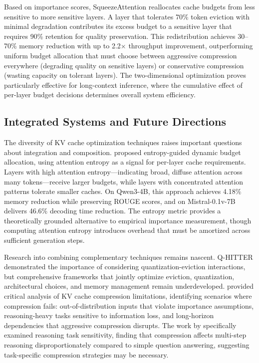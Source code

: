 Based on importance scores, SqueezeAttention reallocates cache budgets from less sensitive to more sensitive layers. A layer that tolerates 70\% token eviction with minimal degradation contributes its excess budget to a sensitive layer that requires 90\% retention for quality preservation. This redistribution achieves 30--70\% memory reduction with up to 2.2$\times$ throughput improvement, outperforming uniform budget allocation that must choose between aggressive compression everywhere (degrading quality on sensitive layers) or conservative compression (wasting capacity on tolerant layers). The two-dimensional optimization proves particularly effective for long-context inference, where the cumulative effect of per-layer budget decisions determines overall system efficiency.

\subsection{Integrated Systems and Future Directions}

The diversity of KV cache optimization techniques raises important questions about integration and composition. \citet{kang2024entropy} proposed entropy-guided dynamic budget allocation, using attention entropy as a signal for per-layer cache requirements. Layers with high attention entropy---indicating broad, diffuse attention across many tokens---receive larger budgets, while layers with concentrated attention patterns tolerate smaller caches. On Qwen3-4B, this approach achieves 4.18\% memory reduction while preserving ROUGE scores, and on Mistral-0.1v-7B delivers 46.6\% decoding time reduction. The entropy metric provides a theoretically grounded alternative to empirical importance measurement, though computing attention entropy introduces overhead that must be amortized across sufficient generation steps.

Research into combining complementary techniques remains nascent. Q-HITTER demonstrated the importance of considering quantization-eviction interactions, but comprehensive frameworks that jointly optimize eviction, quantization, architectural choices, and memory management remain underdeveloped. \citet{paul2024pitfalls} provided critical analysis of KV cache compression limitations, identifying scenarios where compression fails: out-of-distribution inputs that violate importance assumptions, reasoning-heavy tasks sensitive to information loss, and long-horizon dependencies that aggressive compression disrupts. The work by \citet{wang2024holdonto} specifically examined reasoning task sensitivity, finding that compression affects multi-step reasoning disproportionately compared to simple question answering, suggesting task-specific compression strategies may be necessary.

